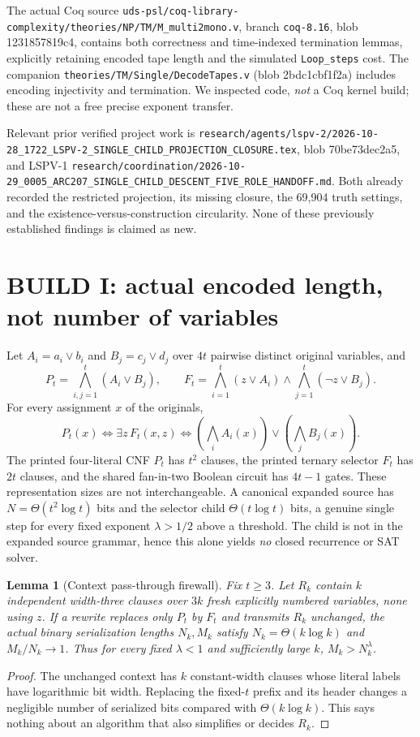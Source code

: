 \documentclass[11pt]{article}
\newtheorem{lemma}{Lemma}
\begin{document}
The actual Coq source \texttt{uds-psl/coq-library-complexity/theories/NP/TM/M_multi2mono.v}, branch \texttt{coq-8.16}, blob 1231857819c4, contains both correctness and time-indexed termination lemmas, explicitly retaining encoded tape length and the simulated \texttt{Loop\_steps} cost. The companion \texttt{theories/TM/Single/DecodeTapes.v} (blob 2bdc1cbf1f2a) includes encoding injectivity and termination. We inspected code, \emph{not} a Coq kernel build; these are not a free precise exponent transfer.

Relevant prior verified project work is \texttt{research/agents/lspv-2/2026-10-28\_1722\_LSPV-2\_SINGLE\_CHILD\_PROJECTION\_CLOSURE.tex}, blob 70be73dec2a5, and LSPV-1 \texttt{research/coordination/2026-10-29\_0005\_ARC207\_SINGLE\_CHILD\_DESCENT\_FIVE\_ROLE\_HANDOFF.md}. Both already recorded the restricted projection, its missing closure, the 69,904 truth settings, and the existence-versus-construction circularity. None of these previously established findings is claimed as new.

\section{BUILD I: actual encoded length, not number of variables}
Let $A_i=a_i\lor b_i$ and $B_j=c_j\lor d_j$ over $4t$ pairwise distinct original variables, and
\[
P_t=\bigwedge_{i,j=1}^t(A_i\lor B_j),\qquad
F_t=\bigwedge_{i=1}^t(z\lor A_i)\land
\bigwedge_{j=1}^t(\neg z\lor B_j).
\]
For every assignment $x$ of the originals,
\[
P_t(x)\iff\exists z\,F_t(x,z)
\iff(\bigwedge_i A_i(x))\lor(\bigwedge_jB_j(x)).
\]
The printed four-literal CNF $P_t$ has $t^2$ clauses, the printed ternary selector $F_t$ has $2t$ clauses, and the shared fan-in-two Boolean circuit has $4t-1$ gates. These representation sizes are not interchangeable. A canonical expanded source has $N=\Theta(t^2\log t)$ bits and the selector child $\Theta(t\log t)$ bits, a genuine single step for every fixed exponent $\lambda>1/2$ above a threshold. The child is not in the expanded source grammar, hence this alone yields \emph{no} closed recurrence or SAT solver.

\begin{lemma}[Context pass-through firewall]
Fix $t\ge3$. Let $R_k$ contain $k$ independent width-three clauses over $3k$ fresh explicitly numbered variables, none using $z$. If a rewrite replaces only $P_t$ by $F_t$ and transmits $R_k$ unchanged, the actual binary serialization lengths $N_k,M_k$ satisfy $N_k=\Theta(k\log k)$ and $M_k/N_k\to1$. Thus for every fixed $\lambda<1$ and sufficiently large $k$, $M_k>N_k^\lambda$.
\end{lemma}
\begin{proof}
The unchanged context has $k$ constant-width clauses whose literal labels have logarithmic bit width. Replacing the fixed-$t$ prefix and its header changes a negligible number of serialized bits compared with $\Theta(k\log k)$. This says nothing about an algorithm that also simplifies or decides $R_k$.
\end{proof}
\end{document}
